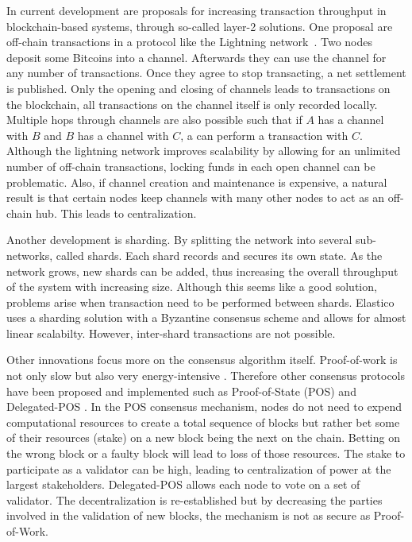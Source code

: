 In current development are proposals for increasing transaction throughput in blockchain-based 
systems, through so-called layer-2 solutions. One proposal are off-chain transactions in a protocol like the Lightning network~\cite{poon2016bitcoin}.
Two nodes deposit some Bitcoins into a channel. Afterwards they can use the channel for any number
of transactions. Once they agree to stop transacting, a net settlement is published. Only the 
opening and closing of channels leads to transactions on the blockchain, all transactions on the 
channel itself is only recorded locally. Multiple hops through channels are also possible such that 
if $A$ has a channel with $B$ and $B$ has a channel with $C$, a can perform a transaction with $C$. 
Although the lightning network improves scalability by allowing for an unlimited number of off-chain 
transactions, locking funds in each open channel can be problematic. Also, if channel creation and 
maintenance is expensive, a natural result is that certain nodes keep channels with many other 
nodes to act as an off-chain hub. This leads to centralization.

Another development is sharding. By splitting the network into several sub-networks, called shards.
Each shard records and secures its own state. As the network grows, new shards can be added, thus 
increasing the overall throughput of the system with increasing size. Although this seems like a 
good solution, problems arise when transaction need to be performed between shards. Elastico~\cite{luu2016secure}
uses a sharding solution with a Byzantine consensus scheme and allows for almost linear scalabilty.
However, inter-shard transactions are not possible.

Other innovations focus more on the consensus algorithm itself. Proof-of-work is not only slow but
also very energy-intensive \cite{bitcoin_energy}. Therefore other consensus protocols have been 
proposed and implemented such as Proof-of-State (POS) and Delegated-POS \cite{bentov2016cryptocurrencies, kiayias2017ouroboros}.
In the POS consensus mechanism, nodes do not need to expend computational resources to create a 
total sequence of blocks but rather bet some of their resources (stake) on a new block being the
next on the chain. Betting on the wrong block or a faulty block will lead to loss of those resources.
The stake to participate as a validator can be high, leading to centralization of power at the largest
stakeholders. Delegated-POS allows each node to vote on a set of validator. The decentralization is
re-established but by decreasing the parties involved in the validation of new blocks, the mechanism
is not as secure as Proof-of-Work.

